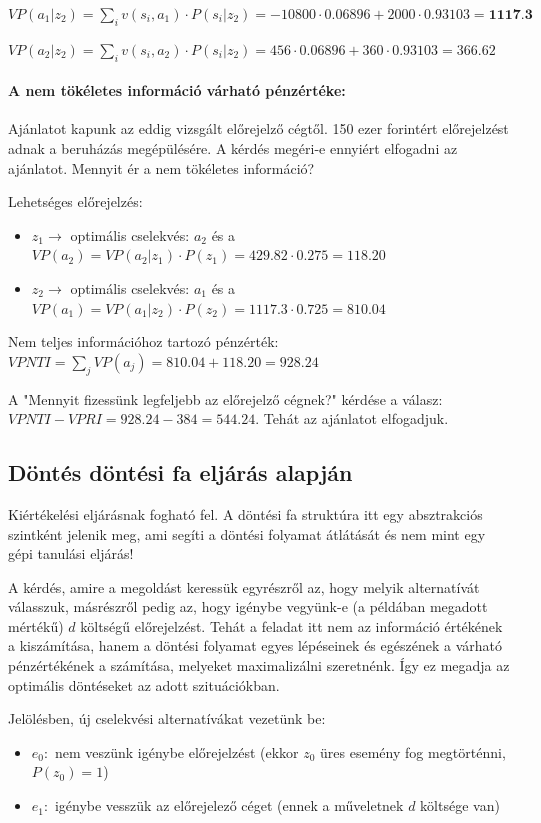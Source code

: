 \documentclass[a4paper,12pt]{article}
\begin{document}
$VP(a_1|z_2) = \sum_{i}v(s_i,a_1)\cdot P(s_i|z_2) = -10800\cdot 0.06896 + 2000\cdot 0.93103 = \textbf{1117.3}$  

$VP(a_2|z_2) = \sum_{i}v(s_i,a_2)\cdot P(s_i|z_2) = 456\cdot 0.06896 + 360\cdot 0.93103 = 366.62$

\paragraph{A nem tökéletes információ várható pénzértéke: }

Ajánlatot kapunk az eddig vizsgált előrejelző cégtől. 150 ezer forintért előrejelzést adnak a beruházás megépülésére. A kérdés megéri-e ennyiért elfogadni az ajánlatot. Mennyit ér a nem tökéletes információ?

Lehetséges előrejelzés:
\begin{itemize}
\item $z_{1} \rightarrow$ optimális cselekvés: $a_2$  és a $VP(a_2) = VP(a_2|z_1) \cdot  P(z_1) = 429.82\cdot 0.275 = 118.20$
\item $z_{2} \rightarrow$ optimális cselekvés: $a_1$  és a $VP(a_1) = VP(a_1|z_2) \cdot  P(z_2) = 1117.3\cdot 0.725 = 810.04$
\end{itemize}

Nem teljes információhoz tartozó pénzérték: $VPNTI = \sum_{j} VP(a_j) = 810.04 + 118.20 = 928.24$

A "Mennyit fizessünk legfeljebb az előrejelző cégnek?" kérdése a válasz: $VPNTI - VPRI = 928.24 - 384 = 544.24$. Tehát az ajánlatot elfogadjuk.

\subsection{Döntés döntési fa eljárás alapján}

Kiértékelési eljárásnak fogható fel. A döntési fa struktúra itt egy absztrakciós szintként jelenik meg, ami segíti a döntési folyamat átlátását és nem mint egy gépi tanulási eljárás!

A kérdés, amire a megoldást keressük egyrészről az, hogy melyik alternatívát válasszuk, másrészről pedig az, hogy igénybe vegyünk-e (a példában megadott mértékű) $d$ költségű előrejelzést. Tehát a feladat itt nem az információ értékének a kiszámítása, hanem a döntési folyamat egyes lépéseinek és egészének a várható pénzértékének a számítása, melyeket maximalizálni szeretnénk. Így ez megadja az optimális döntéseket az adott szituációkban.

Jelölésben, új cselekvési alternatívákat vezetünk be: 
\begin{itemize}
\item $e_{0}:$ nem veszünk igénybe előrejelzést (ekkor $z_{0}$ üres esemény fog megtörténni, $P(z_0) = 1$)
\item $e_{1}:$ igénybe vesszük az előrejelező céget (ennek a műveletnek $d$ költsége van)
\end{itemize}
\end{document}
